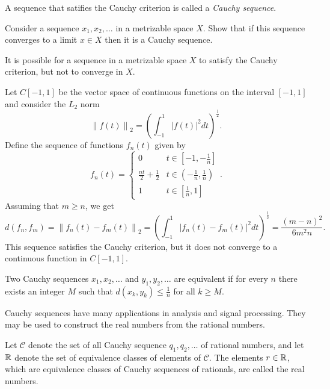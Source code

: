 A sequence that satifies the Cauchy criterion is called a \emph{Cauchy sequence}.

\begin{problem}
Consider a sequence $x_1, x_2, \ldots$ in a metrizable space $X$.
Show that if this sequence converges to a limit $x \in X$ then it is a Cauchy sequence.
\end{problem}

It is possible for a sequence in a metrizable space $X$ to satisfy the Cauchy criterion, but not to converge in $X$.

\begin{example}
Let $C[-1,1]$ be the vector space of continuous functions on the interval $[-1,1]$ and consider the $L_2$ norm
\begin{equation*}
\left\| f(t) \right\|_2 = \left( \int_{-1}^1 |f(t)|^2 dt \right)^{\frac{1}{2}}.
\end{equation*}
Define the sequence of functions $f_n(t)$ given by
\begin{equation*}
f_n(t) = \left\{ \begin{array}{ll}
0 & t \in \left[ -1, -\frac{1}{n} \right] \\
\frac{nt}{2} + \frac{1}{2} & t \in \left( -\frac{1}{n}, \frac{1}{n} \right) \\
1 & t \in \left[ \frac{1}{n}, 1 \right]
\end{array} \right. .
\end{equation*}
Assuming that $m \geq n$, we get
\begin{equation*}
d(f_n, f_m) = \left\| f_n(t) - f_m(t) \right\|_2
= \left( \int_{-1}^1 |f_n(t) - f_m(t)|^2 dt \right)^{\frac{1}{2}}
= \frac{(m-n)^2}{6m^2n}.
\end{equation*}
This sequence satisfies the Cauchy criterion, but it does not converge to a continuous function in $C[-1,1]$.
\end{example}

\begin{definition}
Two Cauchy sequences $x_1, x_2, \ldots$ and $y_1, y_2, \ldots$ are equivalent if for every $n$ there exists an integer $M$ such that $d (x_k, y_k) \leq \frac{1}{n}$ for all $k \geq M$.
\end{definition}

Cauchy sequences have many applications in analysis and signal processing.
They may be used to construct the real numbers from the rational numbers.

\begin{definition}
Let $\mathcal{C}$ denote the set of all Cauchy sequence $q_1, q_2, \ldots$ of rational numbers, and let $\mathbb{R}$ denote the set of equivalence classes of elements of $\mathcal{C}$.
The elements $r \in \mathbb{R}$, which are equivalence classes of Cauchy sequences of rationals, are called the real numbers.
\end{definition}

